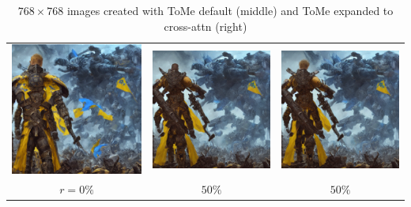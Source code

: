 \begin{table}[!htb]
\centering
\begin{tabular}{c c c}
    \includegraphics[width=0.3\linewidth]{static/sample_imgs/comp_cross/warrior_0.png} & \includegraphics[width=0.3\linewidth]{static/sample_imgs/comp_cross/warrior_nc_50.png} &
    \includegraphics[width=0.3\linewidth]{static/sample_imgs/comp_cross/warrior_c_50.png}\\
    \(r=0\%\) & \(50\%\) & \(50\%\) \\
\end{tabular}
\caption{$768 \times 768$ images created with ToMe default (middle) and ToMe expanded to cross-attn (right)}
\end{table}



